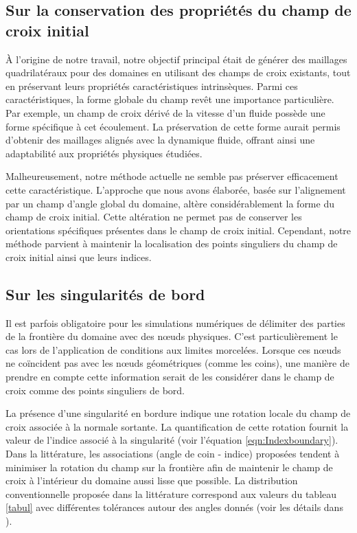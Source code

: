 \subsection{Sur la conservation des propriétés du champ de croix initial}

À l'origine de notre travail, notre objectif principal était de générer des maillages quadrilatéraux pour des domaines en utilisant des champs de croix existants, tout en préservant leurs propriétés caractéristiques intrinsèques. Parmi ces caractéristiques, la forme globale du champ revêt une importance particulière. Par exemple, un champ de croix dérivé de la vitesse d'un fluide possède une forme spécifique à cet écoulement. La préservation de cette forme aurait permis d'obtenir des maillages alignés avec la dynamique fluide, offrant ainsi une adaptabilité aux propriétés physiques étudiées.

Malheureusement, notre méthode actuelle ne semble pas préserver efficacement cette caractéristique. L'approche que nous avons élaborée, basée sur l'alignement par un champ d'angle global du domaine, altère considérablement la forme du champ de croix initial. Cette altération ne permet pas de conserver les orientations spécifiques présentes dans le champ de croix initial. Cependant, notre méthode parvient à maintenir la localisation des points singuliers du champ de croix initial ainsi que leurs indices.

\subsection{Sur les singularités de bord}
\label{subsec:sing_bord}
Il est parfois obligatoire pour les simulations numériques de délimiter des parties de la frontière du domaine avec des nœuds physiques. C'est particulièrement le cas lors de l'application de conditions aux limites morcelées. Lorsque ces nœuds ne coïncident pas avec les nœuds géométriques (comme les coins), une manière de prendre en compte cette information serait de les considérer dans le champ de croix comme des points singuliers de bord.

La présence d'une singularité en bordure indique une rotation locale du champ de croix associée à la normale sortante. La quantification de cette rotation fournit la valeur de l'indice associé à la singularité (voir l'équation \eqref{eqn:Indexboundary}). Dans la littérature, les associations (angle de coin - indice) proposées tendent à minimiser la rotation du champ sur la frontière afin de maintenir le champ de croix à l'intérieur du domaine aussi lisse que possible. La distribution conventionnelle proposée dans la littérature correspond aux valeurs du tableau \ref{tabul} avec différentes tolérances autour des angles donnés (voir les détails dans \cite{macq2020ginzburg}).

